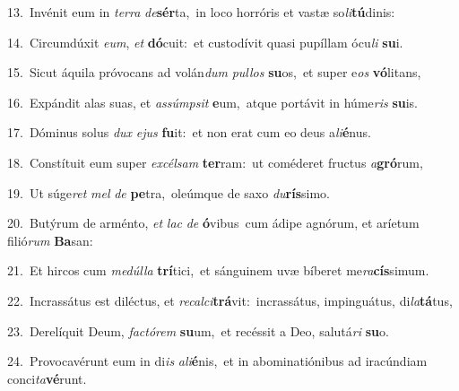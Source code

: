 {\numbfont\textcolor{\numbcolor}{13.}}~Invénit eum in \textit{ter}\-\textit{ra} \textit{de}\-\textbf{sér}ta,~\star in loco horróris et vastæ so\-\textit{li}\-\textbf{tú}dinis:\par
{\numbfont\textcolor{\numbcolor}{14.}}~Circumdúxit \textit{e}\-\textit{um}, \textit{et} \textbf{dó}\-cuit:~\star et custodívit quasi pupíllam ócu\textit{li} \textbf{su}\-i.\par
{\numbfont\textcolor{\numbcolor}{15.}}~Sicut áquila próvocans ad volán\textit{dum} \textit{pul}\-\textit{los} \textbf{su}\-os,~\star et super e\textit{os} \textbf{vó}\-litans,\par
{\numbfont\textcolor{\numbcolor}{16.}}~Expándit alas suas, et \textit{as}\-\textit{súmp}\textit{sit} \textbf{e}\-um,~\star atque portávit in húme\textit{ris} \textbf{su}\-is.\par
{\numbfont\textcolor{\numbcolor}{17.}}~Dóminus solus \textit{dux} \textit{e}\-\textit{jus} \textbf{fu}\-it:~\star et non erat cum eo deus a\-\textit{li}\-\textbf{é}nus.\par
{\numbfont\textcolor{\numbcolor}{18.}}~Constítuit eum super \textit{ex}\-\textit{cél}\textit{sam} \textbf{ter}\-ram:~\star ut coméderet fructus \textit{a}\-\textbf{gró}rum,\par
{\numbfont\textcolor{\numbcolor}{19.}}~Ut súge\textit{ret} \textit{mel} \textit{de} \textbf{pe}\-tra,~\star oleúmque de saxo \textit{du}\-\textbf{rís}simo.\par
{\numbfont\textcolor{\numbcolor}{20.}}~Butýrum de arménto, \textit{et} \textit{lac} \textit{de} \textbf{ó}\-vibus~\star cum ádipe agnórum, et aríetum filió\textit{rum} \textbf{Ba}\-san:\par
{\numbfont\textcolor{\numbcolor}{21.}}~Et hircos cum \textit{me}\-\textit{dúl}\textit{la} \textbf{trí}\-tici,~\star et sánguinem uvæ bíberet me\-\textit{ra}\-\textbf{cís}simum.\par
{\numbfont\textcolor{\numbcolor}{22.}}~Incrassátus est diléctus, et \textit{re}\-\textit{cal}\textit{ci}\textbf{trá}vit:~\star incrassátus, impinguátus, di\-\textit{la}\-\textbf{tá}tus,\par
{\numbfont\textcolor{\numbcolor}{23.}}~Derelíquit Deum, \textit{fac}\-\textit{tó}\textit{rem} \textbf{su}\-um,~\star et recéssit a Deo, salutá\textit{ri} \textbf{su}\-o.\par
{\numbfont\textcolor{\numbcolor}{24.}}~Provocavérunt eum in di\textit{is} \textit{a}\-\textit{li}\textbf{é}nis,~\star et in abominatiónibus ad iracúndiam conci\-\textit{ta}\-\textbf{vé}runt.\par
